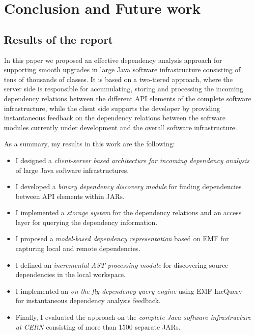 \chapter{Conclusion and Future work}


\section{Results of the report}

In this paper we proposed an effective dependency analysis approach for
supporting smooth upgrades in large Java software infrastructure consisting of
tens of thousands of classes. It is based on a two-tiered approach, where the
server side is responsible for accumulating, storing and processing the incoming
dependency relations between the different API elements of the complete software
infrastructure, while the client side supports the developer by providing
instantaneous feedback on the dependency relations between the software modules
currently under development and the overall software infrastructure.

As a summary, my results in this work are the following:
\begin{itemize}
\item I designed a \emph{client-server based architecture for incoming
dependency analysis} of large Java software infrastructures.
\item I developed a \emph{binary dependency discovery module} for finding
dependencies between API elements within JARs.
\item I implemented a \emph{storage system} for the dependency relations and an
access layer for querying the dependency information.
\item I proposed a \emph{model-based dependency representation} based on EMF for
capturing local and remote dependencies.
\item I defined an \emph{incremental AST processing module} for discovering
source dependencies in the local workspace.
\item I implemented an \emph{on-the-fly dependency query engine} using
EMF-IncQuery for instantaneous dependency analysis feedback.
\item Finally, I evaluated the approach on the \emph{complete Java software
infrastructure at CERN} consisting of more than 1500 separate JARs.
\end{itemize}

